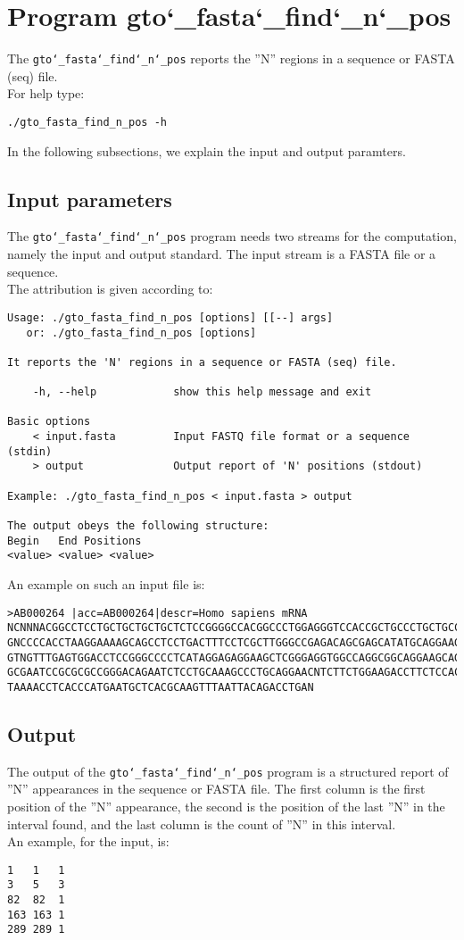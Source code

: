 \section{Program gto\char`_fasta\char`_find\char`_n\char`_pos}
The \texttt{gto\char`_fasta\char`_find\char`_n\char`_pos} reports the ''N'' regions in a sequence or FASTA (seq) file.\\
For help type:
\begin{lstlisting}
./gto_fasta_find_n_pos -h
\end{lstlisting}
In the following subsections, we explain the input and output paramters.

\subsection*{Input parameters}

The \texttt{gto\char`_fasta\char`_find\char`_n\char`_pos} program needs two streams for the computation,
namely the input and output standard. The input stream is a FASTA file or a sequence.\\
The attribution is given according to:
\begin{lstlisting}
Usage: ./gto_fasta_find_n_pos [options] [[--] args]
   or: ./gto_fasta_find_n_pos [options]

It reports the 'N' regions in a sequence or FASTA (seq) file.

    -h, --help            show this help message and exit

Basic options
    < input.fasta         Input FASTQ file format or a sequence (stdin)
    > output              Output report of 'N' positions (stdout)

Example: ./gto_fasta_find_n_pos < input.fasta > output

The output obeys the following structure:
Begin	End	Positions
<value>	<value>	<value>
\end{lstlisting}
An example on such an input file is:
\begin{lstlisting}
>AB000264 |acc=AB000264|descr=Homo sapiens mRNA 
NCNNNACGGCCTCCTGCTGCTGCTGCTCTCCGGGGCCACGGCCCTGGAGGGTCCACCGCTGCCCTGCTGCCATTGTCCCC
GNCCCCACCTAAGGAAAAGCAGCCTCCTGACTTTCCTCGCTTGGGCCGAGACAGCGAGCATATGCAGGAAGCGGCAGGAA
GTNGTTTGAGTGGACCTCCGGGCCCCTCATAGGAGAGGAAGCTCGGGAGGTGGCCAGGCGGCAGGAAGCAGGCCAGTGCC
GCGAATCCGCGCGCCGGGACAGAATCTCCTGCAAAGCCCTGCAGGAACNTCTTCTGGAAGACCTTCTCCACCCCCCCAGC
TAAAACCTCACCCATGAATGCTCACGCAAGTTTAATTACAGACCTGAN
\end{lstlisting}

\subsection*{Output}
The output of the \texttt{gto\char`_fasta\char`_find\char`_n\char`_pos} program is a structured report of ''N'' appearances in the sequence or FASTA file. The first column is the first position of the ''N'' appearance, the second is the position of the last ''N'' in the interval found, and the last column is the count of ''N'' in this interval. \\
An example, for the input, is:
\begin{lstlisting}
1	1	1
3	5	3
82	82	1
163	163	1
289	289	1
\end{lstlisting}
